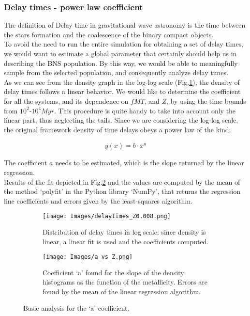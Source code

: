 \documentclass[preprint,12pt]{elsarticle}
\begin{document}
\subsubsection{\textbf{Delay times - power law coefficient}}
The definition of Delay time in gravitational wave astronomy is the time between the stars formation and the coalescence of the binary compact objects.\\
To avoid the need to run the entire simulation for obtaining a set of delay times, we would want to estimate a global parameter that certainly should help us in describing the BNS population. By this way, we would be able to meaningfully sample from the selected population, and consequently analyze delay times.\\  
As we can see from the density graph in the log-log scale (Fig.\ref{img:delaytimes}), the density of delay times follows a linear behavior. We would like to determine the coefficient for all the systems, and its dependence on $fMT$, and $Z$, by using the time bounds from $10^2$-$10^4 Myr$. This procedure is quite handy to take into account only the linear part, thus neglecting the tails. Since we are considering the log-log scale, the original framework density of time delays obeys a power law of the kind:

\begin{align*}
    y(x) = b \cdot x^a
\end{align*}

The coefficient $a$ needs to be estimated, which is the slope returned by the linear regression.\\
Results of the fit depicted in Fig.\ref{img:a_vs_Z} and the values are computed by the mean of the method `polyfit' in the Python library `NumPy', that returns the regression line coefficients and errors given by the least-squares algorithm. 

\begin{figure}[htp]
    \begin{subfigure}[t]{0.50\textwidth}
      \centering
      \texttt{[image: Images/delaytimes\_Z0.008.png]}
      \caption{Distribution of delay times in log scale: since density is linear, a linear fit is used and the coefficients computed.}
      \label{img:delaytimes}
    \end{subfigure}
    \hfill
    \begin{subfigure}[t]{0.50\textwidth}
      \centering
      \texttt{[image: Images/a\_vs\_Z.png]}
      \caption{Coefficient `a' found for the slope of the density histograms as the function of the metallicity. Errors are found by the mean of the linear regression algorithm.}
      \label{img:a_vs_Z}
    \end{subfigure}
    \caption{Basic analysis for the `a' coefficient.}
    \label{img:a_coefficient_first}
  \end{figure}
\end{document}
